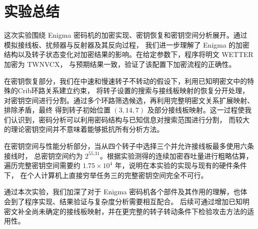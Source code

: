 \section{实验总结}
\indent 这次实验围绕 Enigma 密码机的加密实现、密钥恢复和密钥空间分析展开。通过模拟接线板、扰频器与反射器及其反向过程，
我们进一步理解了 Enigma 的加密结构以及转子状态变化对加密结果的影响。在给定参数下，程序将明文 WETTER 加密为 TWNVCX，
与预期结果一致，验证了该配置下加密流程的正确性。

在密钥恢复部分，我们在中速和慢速转子不转动的假设下，利用已知明密文中的特殊的Crib环路关系建立约束，
将转子设置的搜索与接线板映射的恢复分开处理，对密钥空间进行分割。通过多个环路筛选候选，再利用完整明密文关系扩展映射、排除矛盾，最终
得到转子初始位置 \((3,14,7)\) 及部分接线板映射。这一过程使我们认识到，密码分析可以利用密码结构与已知信息对搜索范围进行分割，
而较大的理论密钥空间并不意味着能够抵抗所有分析方法。

在密钥空间与性能分析部分，当从四个转子中选择三个并允许接线板最多使用六条接线时，
总密钥空间约为 \(2^{55.31}\)。根据实验测得的连续加密吞吐量进行粗略估算，遍历完整密钥空间需要约 \(1.75\times10^4\) 年，说明在本实验的实现与现有的硬件条件下，
在个人计算机上直接穷举任务三的完整密钥空间完全不可行。


通过本次实验，我们加深了对于 Enigma 密码机各个部件及其作用的理解，也体会到了程序实现、结果验证与复杂度分析需要相互配合。
后续可通过增加已知明密文补全尚未确定的接线板映射，并在更完整的转子转动条件下检验攻击方法的适用性。